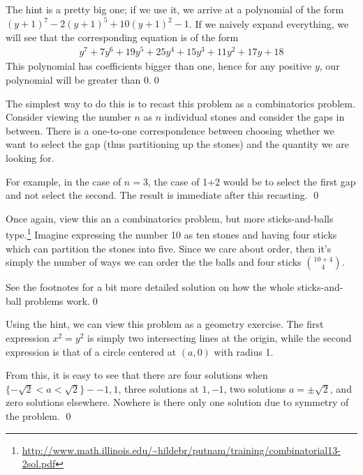 \setcounter{Exercise}{7}
\begin{Exercise}
	The hint is a pretty big one; if we use it, we arrive at a polynomial of the form $(y+1)^7 - 2(y+1)^5 + 10(y+1)^2 - 1$.
	If we naively expand everything, we will see that the corresponding equation is of the form
	\begin{align}
		y^7 + 7y^6 + 19y^5 + 25y^4 + 15y^3 + 11y^2 + 17y + 18
	\end{align}
	This polynomial has coefficients bigger than one, hence for any positive $y$, our polynomial will be greater than 0.\qed
\end{Exercise}

\begin{Exercise}
	The simplest way to do this is to recast this problem as a combinatorics problem. 
	Consider viewing the number $n$ as $n$ individual stones and consider the gaps in between.
	There is a one-to-one correspondence between choosing whether we want to select the gap (thus partitioning up the stones)
	and the quantity we are looking for. 

	For example, in the case of $n=3$, the case of 1+2 would be to select the first gap and not select the second. 
	The result is immediate after this recasting. \qed
\end{Exercise}

\begin{Exercise}
	Once again, view this an a combinatorics problem, but more sticks-and-balls type.\footnote{\url{http://www.math.illinois.edu/~hildebr/putnam/training/combinatorial13-2sol.pdf}} Imagine expressing the number 10 as ten stones and having four sticks
	which can partition the stones into five. Since we care about order, then it's simply the number of ways we can order the
	the balls and four sticks $\binom{10+4}{4}$. 

	See the footnotes for a bit more detailed solution on how the whole sticks-and-ball problems work.\qed
\end{Exercise}

\begin{Exercise}
	Using the hint, we can view this problem as a geometry exercise.
	The first expression $x^2 = y^2$ is simply two intersecting lines
	at the origin, while the second expression is that of a circle
	centered at $(a, 0)$ with radius 1. 

	From this, it is easy to see that there are four solutions when
	$\{-\sqrt{2} < a < \sqrt{2}\} - {-1, 1}$, three solutions at ${1,-1}$, two solutions $a=\pm\sqrt{2}$, and zero solutions elsewhere. Nowhere is there only one solution
	due to symmetry of the problem. \qed
\end{Exercise}

